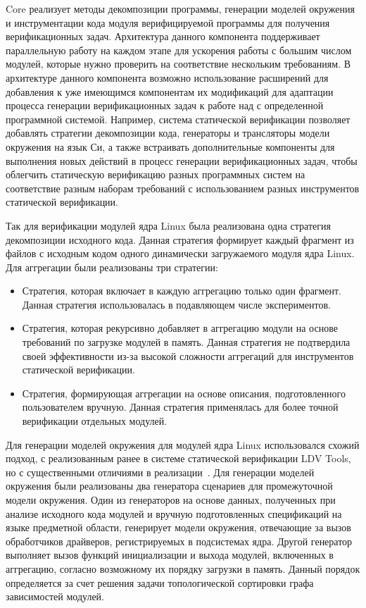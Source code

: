 \documentclass[%
candidate,     %
href,        %
colorlinks,  %
]{disser}
\begin{document}
Core реализует методы декомпозиции программы, генерации моделей окружения и инструментации кода модуля верифицируемой программы для получения верификационных задач.
Архитектура данного компонента поддерживает параллельную работу на каждом этапе для ускорения работы с большим числом модулей, которые нужно проверить на соответствие нескольким требованиям.
В архитектуре данного компонента возможно использование расширений для добавления к уже имеющимся компонентам их модификаций для адаптации процесса генерации верификационных задач к работе над с определенной программной системой.
Например, система статической верификации позволяет добавлять стратегии декомпозиции кода, генераторы и трансляторы модели окружения на язык Си, а также встраивать дополнительные компоненты для выполнения новых действий в процесс генерации верификационных задач, чтобы облегчить статическую верификацию разных программных систем на соответствие разным наборам требований с использованием разных инструментов статической верификации.

Так для верификации модулей ядра Linux была реализована одна стратегия декомпозиции исходного кода.
Данная стратегия формирует каждый фрагмент из файлов с исходным кодом одного динамически загружаемого модуля ядра Linux.
Для аггрегации были реализованы три стратегии:
\begin{itemize}
    \item Стратегия, которая включает в каждую аггрегацию только один фрагмент.
    Данная стратегия использовалась в подавляющем числе экспериментов.
    \item Стратегия, которая рекурсивно добавляет в аггрегацию модули на основе требований по загрузке модулей в память.
    Данная стратегия не подтвердила своей эффективности из-за высокой сложности аггрегаций для инструментов статической верификации.
    \item Стратегия, формирующая аггрегации на основе описания, подготовленного пользователем вручную.
    Данная стратегия применялась для более точной верификации отдельных модулей.
\end{itemize}

Для генерации моделей окружения для модулей ядра Linux использовался схожий подход, с реализованным ранее в системе статической верификации LDV Tools, но с существенными отличиями в реализации~\cite{ZakharovEnv2015}.
Для генерации моделей окружения были реализованы два генератора сценариев для промежуточной модели окружения.
Один из генераторов на основе данных, полученных при анализе исходного кода модулей и вручную подготовленных спецификаций на языке предметной области, генерирует модели окружения, отвечающие за вызов обработчиков драйверов, регистрируемых в подсистемах ядра.
Другой генератор выполняет вызов функций инициализации и выхода модулей, включенных в аггрегацию, согласно возможному их порядку загрузки в память.
Данный порядок определяется за счет решения задачи топологической сортировки графа зависимостей модулей.
\end{document}
